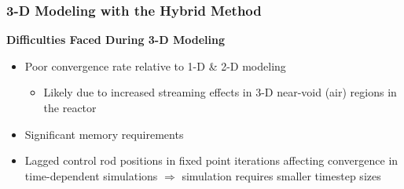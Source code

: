 \begin{frame}
  \frametitle{3-D Modeling with the Hybrid Method}
  \begin{block}{\textbf{Difficulties Faced During 3-D Modeling}}
  \begin{itemize}
    \item Poor convergence rate relative to 1-D \& 2-D modeling
    \begin{itemize}
      \item Likely due to increased streaming effects in 3-D near-void (air) regions in the reactor
    \end{itemize}
    \item Significant memory requirements
    \item Lagged control rod positions in fixed point iterations affecting convergence in time-dependent
      simulations $\Rightarrow$ simulation requires smaller timestep sizes
  \end{itemize}
\end{block}
\end{frame}
